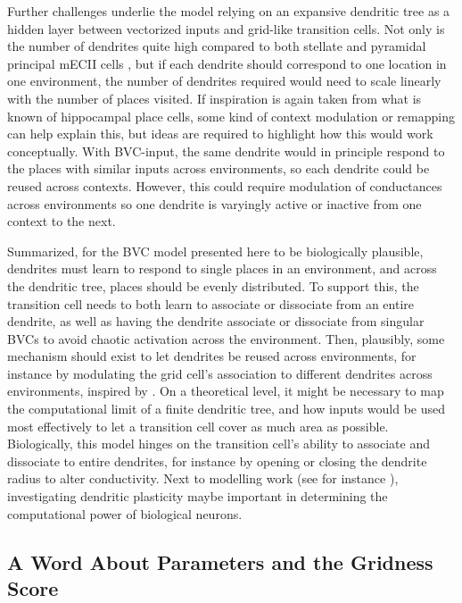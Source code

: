 \documentclass{article}
\begin{document}
    Further challenges underlie the model relying on an expansive dendritic tree as a hidden layer between vectorized inputs and grid-like transition cells. Not only is the number of dendrites quite high compared to both stellate and pyramidal principal mECII cells \parencite{Klink1997}, but if each dendrite should correspond to one location in one environment, the number of dendrites required would need to scale linearly with the number of places visited. If inspiration is again taken from what is known of hippocampal place cells, some kind of context modulation or remapping can help explain this, but ideas are required to highlight how this would work conceptually. With BVC-input, the same dendrite would in principle respond to the places with similar inputs across environments, so each dendrite could be reused across contexts. However, this could require modulation of conductances across environments so one dendrite is varyingly active or inactive from one context to the next.

    Summarized, for the BVC model presented here to be biologically plausible, dendrites must learn to respond to single places in an environment, and across the dendritic tree, places should be evenly distributed. To support this, the transition cell needs to both learn to associate or dissociate from an entire dendrite, as well as having the dendrite associate or dissociate from singular BVCs to avoid chaotic activation across the environment. Then, plausibly, some mechanism should exist to let dendrites be reused across environments, for instance by modulating the grid cell's association to different dendrites across environments, inspired by \parencite{Alabi2022}. 
    On a theoretical level, it might be necessary to map the computational limit of a finite dendritic tree, and how inputs would be used most effectively to let a transition cell cover as much area as possible. Biologically, this model hinges on the transition cell's ability to associate and dissociate to entire dendrites, for instance by opening or closing the dendrite radius to alter conductivity. Next to modelling work (see for instance \cite{Hodassman2022}), investigating dendritic plasticity maybe important in determining the computational power of biological neurons.

    \subsection{A Word About Parameters and the Gridness Score}\label{ParameterDiscussion}
\end{document}
